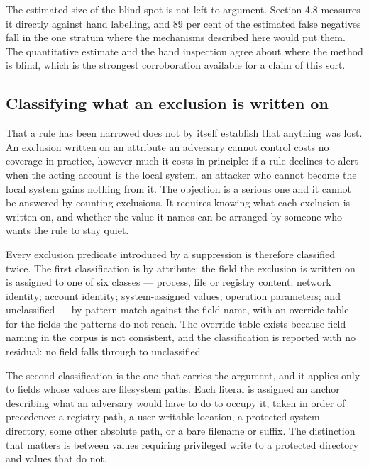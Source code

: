 The estimated size of the blind spot is not left to argument. Section 4.8 measures it directly against hand labelling, and 89 per cent of the estimated false negatives fall in the one stratum where the mechanisms described here would put them. The quantitative estimate and the hand inspection agree about where the method is blind, which is the strongest corroboration available for a claim of this sort.

\subsection{Classifying what an exclusion is written on}
\label{sec:classifying}

That a rule has been narrowed does not by itself establish that anything was lost. An exclusion written on an attribute an adversary cannot control costs no coverage in practice, however much it costs in principle: if a rule declines to alert when the acting account is the local system, an attacker who cannot become the local system gains nothing from it. The objection is a serious one and it cannot be answered by counting exclusions. It requires knowing what each exclusion is written on, and whether the value it names can be arranged by someone who wants the rule to stay quiet.

Every exclusion predicate introduced by a suppression is therefore classified twice. The first classification is by attribute: the field the exclusion is written on is assigned to one of six classes --- process, file or registry content; network identity; account identity; system-assigned values; operation parameters; and unclassified --- by pattern match against the field name, with an override table for the fields the patterns do not reach. The override table exists because field naming in the corpus is not consistent, and the classification is reported with no residual: no field falls through to unclassified.

The second classification is the one that carries the argument, and it applies only to fields whose values are filesystem paths. Each literal is assigned an anchor describing what an adversary would have to do to occupy it, taken in order of precedence: a registry path, a user-writable location, a protected system directory, some other absolute path, or a bare filename or suffix. The distinction that matters is between values requiring privileged write to a protected directory and values that do not.

